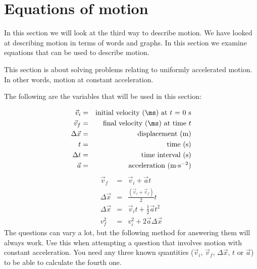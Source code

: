          \section{Equations of motion}
    \nopagebreak
      \label{m38796*id75595}In this section we will look at the third way to describe motion. We have looked at describing motion in terms of words and graphs. In this section we examine equations that can be used to describe motion.\par 
      \label{m38796*id75600}This section is about solving problems relating to uniformly accelerated motion. In other words, motion at constant acceleration.\par 
      \label{m38796*id75605}The following are the variables that will be used in this section:\par 
      \label{m38796*id75611}\nopagebreak\noindent{}
\begin{eqnarray*}
\vec{v}_i &=& \mbox{initial velocity (\ms) at $t$ = 0 s} \\
\vec{v}_f &=& \mbox{final velocity (\ms) at time $t$}\\
\Delta \vec{x} &=& \mbox{displacement (m)} \\
t &=& \mbox{time (s)} \\
\Delta t &=& \mbox{time interval (s)} \\
\vec{a} &=& \mbox{acceleration (m$\cdot$s$^{-2}$)}
\end{eqnarray*}
      \label{m38796*eip-506}\nopagebreak\noindent{}
\begin{eqnarray}
\vec{v}_f &=& \vec{v}_i + \vec{a}t \label{eq:eq1}\\
\Delta \vec{x} &=& \frac{(\vec{v}_i + \vec{v}_f)}{2} t\label{eq:eq2}\\
\Delta \vec{x} &=& \vec{v}_it + \frac{1}{2}\vec{a}t^2 \label{eq:eq3}\\
v_f^2 &=& v_i^2 + 2\vec{a} \Delta \vec{x} \label{eq:eq4}
\end{eqnarray}
      \label{m38796*id76069}The questions can vary a lot, but the following method for answering them will always work. Use this when attempting a question that involves motion with constant acceleration. You need any three known quantities ($\vec{v}_{i}$, $\vec{v}_{f}$, $\Delta \vec{x}$, $t$ or $\vec{a}$) to be able to calculate the fourth one.\par 
